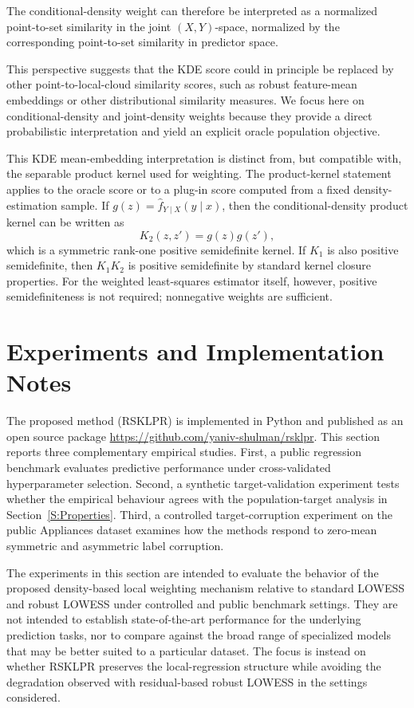 \documentclass[preprint,1p,times,authoryear]{elsarticle}
\begin{document}
The conditional-density weight can therefore be interpreted as a normalized point-to-set similarity in the joint \((X,Y)\)-space, normalized by the corresponding point-to-set similarity in predictor space.

This perspective suggests that the KDE score could in principle be replaced by other point-to-local-cloud similarity scores, such as robust feature-mean embeddings or other distributional similarity measures. We focus here on conditional-density and joint-density weights because they provide a direct probabilistic interpretation and yield an explicit oracle population objective.

This KDE mean-embedding interpretation is distinct from, but compatible with, the separable product kernel used for weighting. The product-kernel statement applies to the oracle score or to a plug-in score computed from a fixed density-estimation sample. If \(g(z)=\hat f_{Y\mid X}(y\mid x)\), then the conditional-density product kernel can be written as
\[
K_2(z,z')=g(z)g(z'),
\]
which is a symmetric rank-one positive semidefinite kernel. If \(K_1\) is also positive semidefinite, then \(K_1K_2\) is positive semidefinite by standard kernel closure properties. For the weighted least-squares estimator itself, however, positive semidefiniteness is not required; nonnegative weights are sufficient.

\section{Experiments and Implementation Notes}
\label{S:Experiments and Implementation Notes}
The proposed method (RSKLPR) is implemented in Python and published as an open source package \href{https://github.com/yaniv-shulman/rsklpr}{https://github.com/yaniv-shulman/rsklpr}. This section reports three complementary empirical studies. First, a public regression benchmark evaluates predictive performance under cross-validated hyperparameter selection. Second, a synthetic target-validation experiment tests whether the empirical behaviour agrees with the population-target analysis in Section~\ref{S:Properties}. Third, a controlled target-corruption experiment on the public Appliances dataset examines how the methods respond to zero-mean symmetric and asymmetric label corruption.

The experiments in this section are intended to evaluate the behavior of the proposed density-based local weighting mechanism relative to standard LOWESS and robust LOWESS under controlled and public benchmark settings. They are not intended to establish state-of-the-art performance for the underlying prediction tasks, nor to compare against the broad range of specialized models that may be better suited to a particular dataset. The focus is instead on whether RSKLPR preserves the local-regression structure while avoiding the degradation observed with residual-based robust LOWESS in the settings considered.
\end{document}
